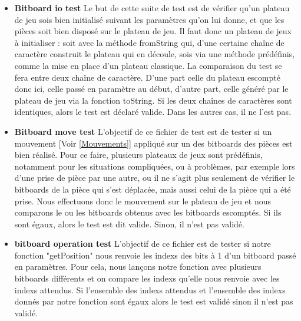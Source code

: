 \huge\documentclass{article}
\begin{document}
\begin{itemize}
    \item \textbf{Bitboard io test}\newline 
    Le but de cette suite de test est de vérifier qu'un plateau de jeu sois bien initialisé suivant les paramètres qu'on lui donne, et que les pièces soit bien disposé sur le plateau de jeu.\newline
    Il faut donc un plateau de jeux à initialiser : soit avec la méthode fromString qui, d'une certaine chaîne de caractère construit le plateau qui en découle, sois via une méthode prédéfinis, comme la mise en place d'un plateau classique.\newline
    La comparaison du test se fera entre deux chaîne de caractère. 
    D'une part celle du plateau escompté donc ici, celle passé en paramètre au début, d'autre part, celle généré par le plateau de jeu via la fonction toString.
    Si les deux chaînes de caractères sont identiques, alors le test est déclaré valide.
    Dans les autres cas, il ne l'est pas.\newline
    
    
    \item \textbf{Bitboard move test} \newline
    L'objectif de ce fichier de test est de tester si un mouvement [Voir \ref{Mouvements}] appliqué sur un des bitboards \cite{Bitboards} des pièces est bien réalisé.\newline
    Pour ce faire, plusieurs plateaux de jeux sont prédéfinis, notamment pour les situations compliquées, ou à problèmes, par exemple lors d'une prise de pièce par une autre, ou il ne s'agit plus seulement de vérifier le bitboards de la pièce qui s'est déplacée, mais aussi celui de la pièce qui a été prise.\newline
    Nous effectuons donc le mouvement sur le plateau de jeu et nous comparons le ou les bitboards obtenus avec les bitboards escomptés.\newline
    Si ils sont égaux, alors le test est dit valide.
    Sinon, il n'est pas validé.\newline
    
    \item \textbf{bitboard operation test}\newline
    L'objectif de ce fichier est de tester si notre fonction "getPosition" nous renvoie les indexs des bits à 1 d'un bitboard passé en paramètres.\newline
    Pour cela, nous lançons notre fonction avec plusieurs bitboards différents et on compare les indexs qu'elle nous renvoie avec les indexs attendus.\newline
    Si l'ensemble des indexs attendus et l'ensemble des indexs donnés par notre fonction sont égaux alors le test est validé sinon il n'est pas validé.\newline
    

\end{itemize}
\end{document}
